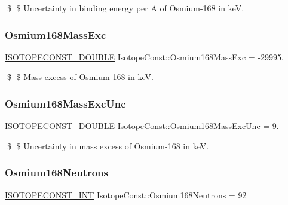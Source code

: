 \$ \$ Uncertainty in binding energy per A of Osmium-\/168 in keV. \mbox{\label{group___isotope_const-_osmium-_os168_ga3a60c611f93bece7b8373acb88f3cb27}} 
\subsubsection{\texorpdfstring{Osmium168\+Mass\+Exc}{Osmium168MassExc}}
{\footnotesize\ttfamily \mbox{\hyperlink{group___isotope_const-_macros_ga8f45a7272ce02c0b4c65c44636ed719a}{I\+S\+O\+T\+O\+P\+E\+C\+O\+N\+S\+T\+\_\+\+D\+O\+U\+B\+LE}} Isotope\+Const\+::\+Osmium168\+Mass\+Exc = -\/29995.}

\$ \$ Mass excess of Osmium-\/168 in keV. \mbox{\label{group___isotope_const-_osmium-_os168_gae2f86faf23efa38314379b09e14f1a45}} 
\subsubsection{\texorpdfstring{Osmium168\+Mass\+Exc\+Unc}{Osmium168MassExcUnc}}
{\footnotesize\ttfamily \mbox{\hyperlink{group___isotope_const-_macros_ga8f45a7272ce02c0b4c65c44636ed719a}{I\+S\+O\+T\+O\+P\+E\+C\+O\+N\+S\+T\+\_\+\+D\+O\+U\+B\+LE}} Isotope\+Const\+::\+Osmium168\+Mass\+Exc\+Unc = 9.}

\$ \$ Uncertainty in mass excess of Osmium-\/168 in keV. \mbox{\label{group___isotope_const-_osmium-_os168_ga18f63875dfced24ef5610293be87a85a}} 
\subsubsection{\texorpdfstring{Osmium168\+Neutrons}{Osmium168Neutrons}}
{\footnotesize\ttfamily \mbox{\hyperlink{group___isotope_const-_macros_ga5f18360b3e99483a35c32d789e62621c}{I\+S\+O\+T\+O\+P\+E\+C\+O\+N\+S\+T\+\_\+\+I\+NT}} Isotope\+Const\+::\+Osmium168\+Neutrons = 92}

